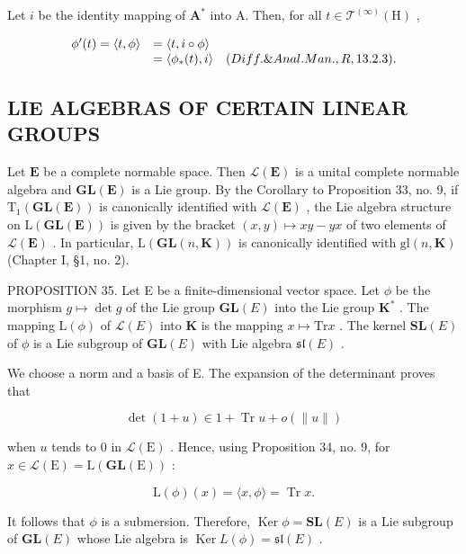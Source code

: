 Let \(i\) be the identity mapping of \(\mathbf{A}^*\) into A. Then, for all \(t\in \mathcal{T}^{(\infty)}(\mathrm{H})\) ,

\[
\begin{array}{r l} \phi^ {\prime} (t) = \langle t, \phi \rangle & = \langle t, i \circ \phi \rangle \\ & = \langle \phi_ {*} (t), i \rangle \quad (Diff. \& Anal. Man., R, 13.2.3). \end{array}
\]

\subsection{LIE ALGEBRAS OF CERTAIN LINEAR GROUPS}

Let \(\mathbf{E}\) be a complete normable space. Then \(\mathcal{L}(\mathbf{E})\) is a unital complete normable algebra and \(\mathbf{GL}(\mathbf{E})\) is a Lie group. By the Corollary to Proposition 33, no. 9, if \(\mathrm{T}_{1}(\mathbf{GL}(\mathbf{E}))\) is canonically identified with \(\mathcal{L}(\mathbf{E})\) , the Lie algebra structure on \(\mathrm{L}(\mathbf{GL}(\mathbf{E}))\) is given by the bracket \((x,y)\mapsto xy - yx\) of two elements of \(\mathcal{L}(\mathbf{E})\) . In particular, \(\mathrm{L}(\mathbf{GL}(n,\mathbf{K}))\) is canonically identified with \(\mathrm{gl}(n,\mathbf{K})\) (Chapter I, §1, no. 2).

PROPOSITION 35. Let E be a finite-dimensional vector space. Let \(\phi\) be the morphism \(g \mapsto \det g\) of the Lie group \(\mathbf{GL}(E)\) into the Lie group \(\mathbf{K}^*\) . The mapping \(\mathrm{L}(\phi)\) of \(\mathcal{L}(E)\) into \(\mathbf{K}\) is the mapping \(x \mapsto \mathrm{Tr}x\) . The kernel \(\mathbf{SL}(E)\) of \(\phi\) is a Lie subgroup of \(\mathbf{GL}(E)\) with Lie algebra \(\mathfrak{sl}(E)\) .

We choose a norm and a basis of E. The expansion of the determinant proves that

\[
\det (1 + u) \in 1 + \operatorname{Tr} u + o (\| u \|)
\]

when \(u\) tends to 0 in \(\mathcal{L}(\mathrm{E})\) . Hence, using Proposition 34, no. 9, for \(x \in \mathcal{L}(\mathrm{E}) = \mathrm{L}(\mathbf{GL}(\mathrm{E}))\) :

\[
\mathrm{L} (\phi) (x) = \langle x, \phi \rangle = \operatorname{Tr} x.
\]

It follows that \(\phi\) is a submersion. Therefore, \(\operatorname{Ker} \phi = \mathbf{SL}(E)\) is a Lie subgroup of \(\mathbf{GL}(E)\) whose Lie algebra is \(\operatorname{Ker} L(\phi) = \mathfrak{sl}(E)\) .

